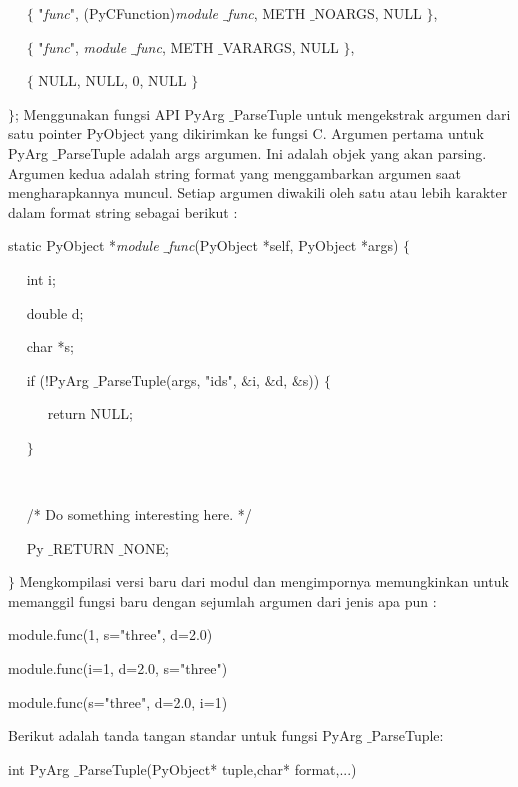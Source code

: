 ~~  $  \{  $ "\textit{func}", (PyCFunction)\textit{module $  \_  $func}, METH $  \_  $NOARGS, NULL  $  \}  $, 

~~  $  \{  $ "\textit{func}", \textit{module $  \_  $func}, METH $  \_  $VARARGS, NULL  $  \}  $, 

~~  $  \{  $ NULL, NULL, 0, NULL  $  \}  $ 

 $  \}  $; 
\vspace{12pt}
Menggunakan fungsi API PyArg $  \_  $ParseTuple untuk mengekstrak argumen dari satu pointer PyObject yang dikirimkan ke fungsi C. Argumen pertama untuk PyArg $  \_  $ParseTuple adalah args argumen. Ini adalah objek yang akan parsing. Argumen kedua adalah string format yang menggambarkan argumen saat mengharapkannya muncul. Setiap argumen diwakili oleh satu atau lebih karakter dalam format string sebagai berikut : 

static PyObject *\textit{module $  \_  $func}(PyObject *self, PyObject *args)  $  \{  $ 

~~ int i;

~~ double d; 

~~ char *s; 
\vspace{12pt}

~~ if (!PyArg $  \_  $ParseTuple(args, "ids",  $  \&  $i,  $  \&  $d,  $  \&  $s))  $  \{  $ 

~~~~~ return NULL; 

~~  $  \}  $ 

~~  

~~ /* Do something interesting here. */ 

~~ Py $  \_  $RETURN $  \_  $NONE; 

 $  \}  $ 
\vspace{12pt}
Mengkompilasi versi baru dari modul dan mengimpornya memungkinkan untuk memanggil fungsi baru dengan sejumlah argumen dari jenis apa pun : 

module.func(1, s="three", d=2.0) 

module.func(i=1, d=2.0, s="three") 

module.func(s="three", d=2.0, i=1) 
\vspace{12pt}
\vspace{12pt}
\vspace{12pt}
\vspace{12pt}

 \hspace*{0.5in} Berikut adalah tanda tangan standar untuk fungsi PyArg $  \_  $ParseTuple: 
 
int PyArg $  \_  $ParseTuple(PyObject* tuple,char* format,...) 
\vspace{12pt}

